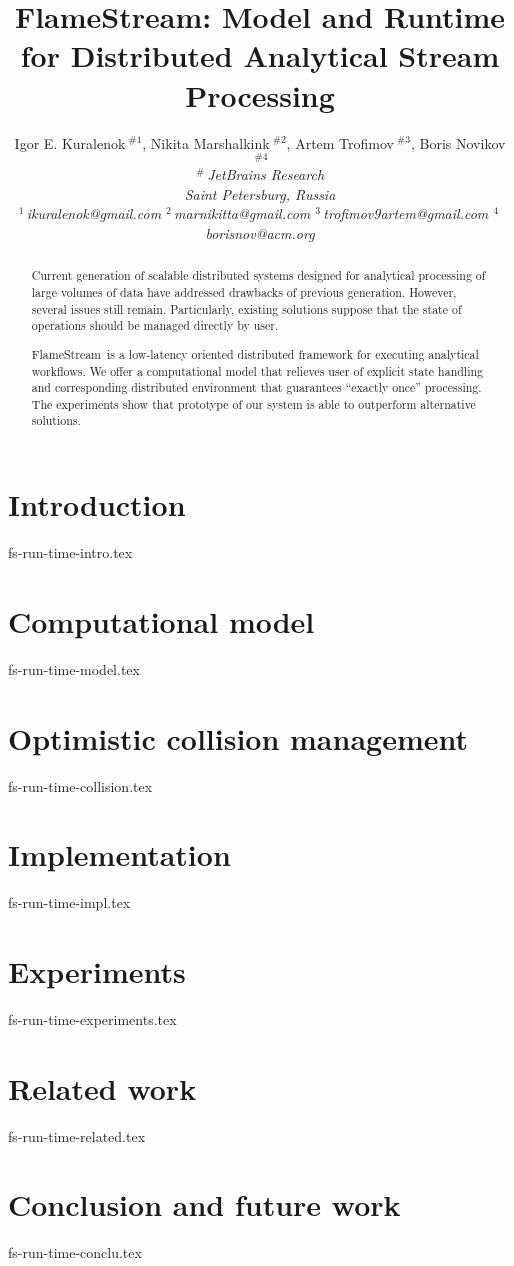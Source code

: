 \documentclass[10pt,conference,letterpaper]{IEEEtran}
\title{FlameStream: Model and Runtime for Distributed Analytical Stream Processing}
\author{%
{Igor E. Kuralenok{\small $~^{\#1}$}, 
    Nikita Marshalkink{\small $~^{\#2}$},
    Artem Trofimov{\small $~^{\#3}$}, 
        Boris Novikov{\small $~^{\#4}$} }%
\vspace{1.6mm}\\
\fontsize{10}{10}\selectfont\itshape
$^{\#}$\,JetBrains Research\\
Saint Petersburg, Russia\\
\fontsize{9}{9}\selectfont\ttfamily\upshape
%
$^1$\,ikuralenok@gmail.com   %
$^2$\,marnikitta@gmail.com    %
$^3$\,trofimov9artem@gmail.com   %
$^4$\,borisnov@acm.org 
}
\newcommand {\FlameStream} {FlameStream}
\begin{document}
\maketitle
%
\begin{abstract} 
Current generation of scalable distributed systems designed for analytical processing of large volumes of data have addressed drawbacks of previous generation. However, several issues still remain. Particularly, existing solutions suppose that the state of operations should be managed directly by user.

\FlameStream\ is a low-latency oriented distributed framework for executing analytical workflows. We offer a computational model that relieves user of explicit state handling and corresponding distributed environment that guarantees ``exactly once'' processing. The experiments show that prototype of our system is able to outperform alternative solutions.
\end{abstract}

%
\section {Introduction}
 {fs-run-time-intro.tex}

\section {Computational model}
 {fs-run-time-model.tex}

\section {Optimistic collision management}
 {fs-run-time-collision.tex}

\section {Implementation}
 {fs-run-time-impl.tex}

\section {Experiments}
 {fs-run-time-experiments.tex}

\section {Related work}
 {fs-run-time-related.tex}

\section {Conclusion and future work}
 {fs-run-time-conclu.tex}



\end{document}
